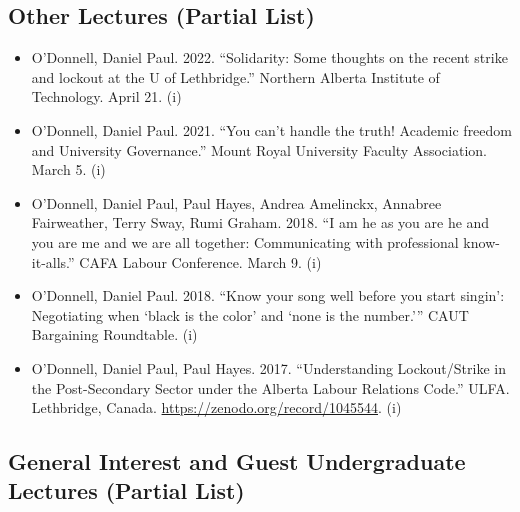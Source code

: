 \documentclass[12pt]{article}
\begin{document}
\subsection*{Other Lectures (Partial List)}

\begin{itemize}
  \item O’Donnell, Daniel Paul. 2022. “Solidarity: Some thoughts on the recent strike and lockout at the U of Lethbridge.” Northern Alberta Institute of Technology. April 21. (i)
  \item O’Donnell, Daniel Paul. 2021. “You can’t handle the truth! Academic freedom and University Governance.” Mount Royal University Faculty Association. March 5. (i)
  \item O’Donnell, Daniel Paul, Paul Hayes, Andrea Amelinckx, Annabree Fairweather, Terry Sway, Rumi Graham. 2018. “I am he as you are he and you are me and we are all together: Communicating with professional know-it-alls.” CAFA Labour Conference. March 9. (i)
  \item O'Donnell, Daniel Paul. 2018. “Know your song well before you start singin’: Negotiating when ‘black is the color’ and ‘none is the number.’” CAUT Bargaining Roundtable. (i)
  \item O'Donnell, Daniel Paul, Paul Hayes. 2017. “Understanding Lockout/Strike in the Post-Secondary Sector under the Alberta Labour Relations Code.” ULFA. Lethbridge, Canada. \url{https://zenodo.org/record/1045544}. (i)
\end{itemize}


\subsection*{General Interest and Guest Undergraduate Lectures (Partial List)}
\end{document}
